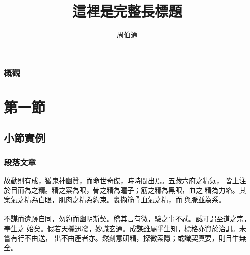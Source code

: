 \documentclass[hyperref={bookmarks=false}]{beamer}
\title[這裡是短標題]{\iyan 這裡是完整長標題} %
\author{周伯通} %
\institute[Uranus] %
{
天王星大學\\ %
\medskip
\texttt{john@smith.com} %
}
\date{\zhtoday} %
\begin{document}
\begin{frame}
\titlepage %
\end{frame}

\begin{frame}
\frametitle{\iyan 概觀} %
\tableofcontents %
\end{frame}


\section{第一節} %

\subsection{小節實例} %

\begin{frame}
\frametitle{\iyan 段落文章}
故動則有成，猶鬼神幽贊，而命世奇傑，時時間出焉。五藏六府之精氣，
皆上注於目而為之精。精之案為眼，骨之精為瞳子；筋之精為黑眼，血之
精為力絡。其案氣之精為白眼，肌肉之精為約束。裹擷筋骨血氣之精，而
與脈並為系。\\~\\

不謀而遺跡自同，勿約而幽明斯契。稽其言有微，驗之事不忒。誠可謂至道之宗，奉生之
始矣。假若天機迅發，妙識玄通。成謀雖屬乎生知，標格亦資於治訓。未嘗有行不由送，
出不由產者亦。然刻意研精，探微索隱；或識契真要，則目牛無全。
\end{frame}
\end{document}
